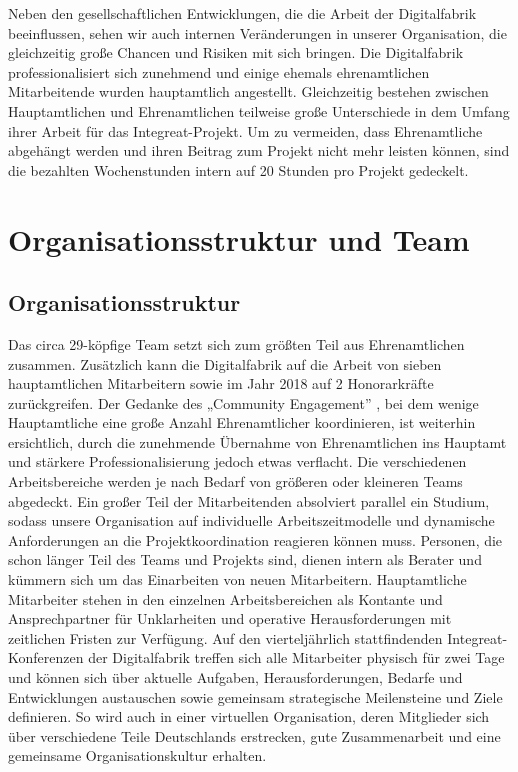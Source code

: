 \documentclass[12pt, a4paper]{article} %
\begin{document}
Neben den gesellschaftlichen Entwicklungen, die die Arbeit der
Digitalfabrik beeinflussen, sehen wir auch internen Veränderungen in
unserer Organisation, die gleichzeitig große Chancen und Risiken mit
sich bringen. Die Digitalfabrik professionalisiert sich zunehmend und
einige ehemals ehrenamtlichen Mitarbeitende wurden hauptamtlich
angestellt. Gleichzeitig bestehen zwischen Hauptamtlichen und
Ehrenamtlichen teilweise große Unterschiede in dem Umfang ihrer Arbeit
für das Integreat-Projekt. Um zu vermeiden, dass Ehrenamtliche abgehängt
werden und ihren Beitrag zum Projekt nicht mehr leisten können, sind die
bezahlten Wochenstunden intern auf 20 Stunden pro Projekt gedeckelt.

\hypertarget{organisationsstruktur-und-team}{%
\section{Organisationsstruktur und
Team}\label{organisationsstruktur-und-team}}

\hypertarget{organisationsstruktur}{%
\subsection{Organisationsstruktur}\label{organisationsstruktur}}

Das circa 29-köpfige Team setzt sich zum größten Teil aus Ehrenamtlichen
zusammen. Zusätzlich kann die Digitalfabrik auf die Arbeit von sieben
hauptamtlichen Mitarbeitern sowie im Jahr 2018 auf 2 Honorarkräfte
zurückgreifen. Der Gedanke des „Community Engagement” , bei dem wenige
Hauptamtliche eine große Anzahl Ehrenamtlicher koordinieren, ist
weiterhin ersichtlich, durch die zunehmende Übernahme von Ehrenamtlichen
ins Hauptamt und stärkere Professionalisierung jedoch etwas verflacht.
Die verschiedenen Arbeitsbereiche werden je nach Bedarf von größeren
oder kleineren Teams abgedeckt. Ein großer Teil der Mitarbeitenden
absolviert parallel ein Studium, sodass unsere Organisation auf
individuelle Arbeitszeitmodelle und dynamische Anforderungen an die
Projektkoordination reagieren können muss. Personen, die schon länger
Teil des Teams und Projekts sind, dienen intern als Berater und kümmern
sich um das Einarbeiten von neuen Mitarbeitern. Hauptamtliche
Mitarbeiter stehen in den einzelnen Arbeitsbereichen als Kontante und
Ansprechpartner für Unklarheiten und operative Herausforderungen mit
zeitlichen Fristen zur Verfügung. Auf den vierteljährlich stattfindenden
Integreat-Konferenzen der Digitalfabrik treffen sich alle Mitarbeiter
physisch für zwei Tage und können sich über aktuelle Aufgaben,
Herausforderungen, Bedarfe und Entwicklungen austauschen sowie gemeinsam
strategische Meilensteine und Ziele definieren. So wird auch in einer
virtuellen Organisation, deren Mitglieder sich über verschiedene Teile
Deutschlands erstrecken, gute Zusammenarbeit und eine gemeinsame
Organisationskultur erhalten.
\end{document}
